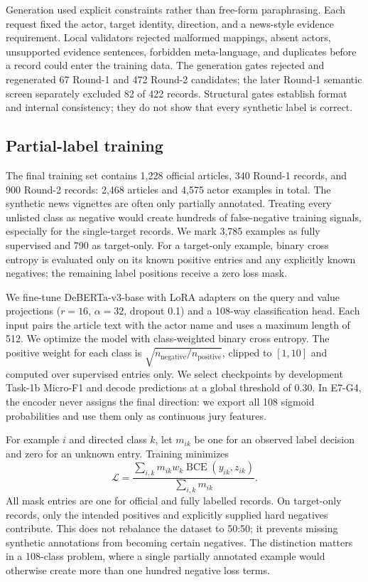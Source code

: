 \documentclass[sigconf,article,a4paper]{acmart}
\begin{document}
Generation used explicit constraints rather than free-form paraphrasing.
Each request fixed the actor, target identity, direction, and a news-style
evidence requirement. Local validators rejected malformed mappings, absent
actors, unsupported evidence sentences, forbidden meta-language, and
duplicates before a record could enter the training data. The generation gates
rejected and regenerated 67 Round-1 and 472 Round-2 candidates; the later
Round-1 semantic screen separately excluded 82 of 422 records. Structural gates
establish format and internal consistency; they do not show that every
synthetic label is correct.

\subsection{Partial-label training}

The final training set contains 1,228 official articles, 340 Round-1 records,
and 900 Round-2 records: 2,468 articles and 4,575 actor examples in total.
The synthetic news vignettes are often only partially annotated. Treating every
unlisted class as negative would create hundreds of false-negative training
signals, especially for the single-target records. We mark 3,785 examples as
fully supervised and 790 as target-only. For a target-only
example, binary cross entropy is evaluated only on its known positive entries
and any explicitly known negatives; the remaining label positions receive a
zero loss mask.

We fine-tune DeBERTa-v3-base \cite{he2021} with LoRA adapters \cite{hu2022} on the query
and value projections ($r=16$, $\alpha=32$, dropout 0.1) and a 108-way
classification head. Each input pairs the article text with the actor name and
uses a maximum length of 512. We optimize the model with class-weighted binary
cross entropy. The positive weight for each class is
$\sqrt{n_{\mathrm{negative}}/n_{\mathrm{positive}}}$, clipped to $[1,10]$ and
computed over supervised entries only. We select checkpoints by development
Task-1b Micro-F1 and decode predictions at a global threshold of 0.30. In
E7-G4, the encoder never assigns the final direction: we export all 108 sigmoid
probabilities and use them only as continuous jury features.

For example $i$ and directed class $k$, let $m_{ik}$ be one for an observed
label decision and zero for an unknown entry. Training minimizes
\begin{equation}
\mathcal{L}=\frac{\sum_{i,k}m_{ik}w_k\operatorname{BCE}(y_{ik},z_{ik})}
{\sum_{i,k}m_{ik}}.
\end{equation}
All mask entries are one for official and fully labelled records. On
target-only records, only the intended positives and explicitly supplied hard
negatives contribute. This does not rebalance the dataset to 50:50; it prevents
missing synthetic annotations from becoming certain negatives. The distinction
matters in a 108-class problem, where a single partially annotated example
would otherwise create more than one hundred negative loss terms.
\end{document}

